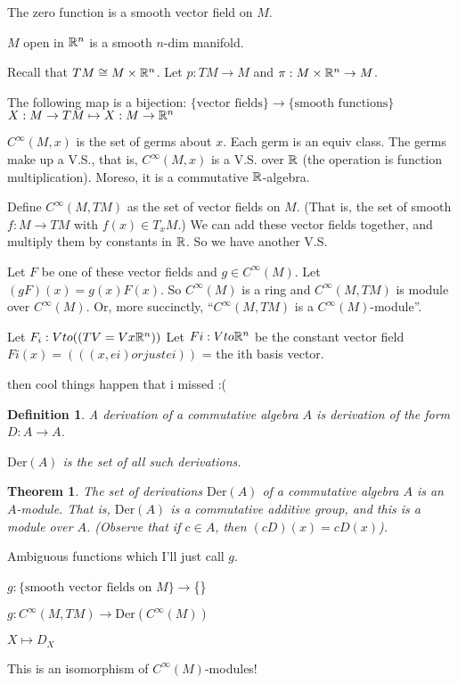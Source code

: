 \documentclass[11pt,leqno,oneside]{amsart}
\newcommand{\Der}{\text{Der}}
\theoremstyle{mystyle} \newtheorem{thrm}[thm]{Theorem}
\theoremstyle{mystyle} \newtheorem{defi}[thm]{Definition}
\begin{document}
\begin{example}
	The zero function is a smooth vector field on $M$.
\end{example}
\begin{example}
	$M$ open in ${\mathbb R}^n$ is a smooth $n$-dim manifold.

	Recall that $TM \mathrel{\cong}   M \times {\mathbb R}^n$.  Let $p:TM \to M$ and $\pi:M \times {\mathbb R}^n \to M$.

	The following map is a bijection:
	$\{\text{vector fields}\} \to \{\text{smooth functions}\}$
	$        X: M \to TM      \mapsto     X: M \to {\mathbb R}^n$
\end{example}
\begin{example}
	$C^\infty(M,x)$ is the set of germs about $x$.
	Each germ is an equiv class.
	The germs make up a V.S., that is, $C^\infty(M,x)$ is a V.S. over ${\mathbb R}$ (the operation is function multiplication).  Moreso, it is a commutative ${\mathbb R}$-algebra.

	Define $C^\infty(M, TM)$ as the set of vector fields on $M$.  (That is, the set of smooth $f: M \to TM$ with $f(x) \in T_xM$.)  We can add these vector fields together, and multiply them by constants in ${\mathbb R}$.  So we have another V.S.

	Let $F$ be one of these vector fields and $g \in C^\infty(M)$.
	Let $(gF)(x) = g(x)F(x)$.
	So $C^\infty(M)$ is a ring and $C^\infty(M, TM)$ is module over $C^\infty(M)$.  Or, more succinctly, ``$C^\infty(M, TM)$ is a $C^\infty(M)$-module''.

	Let $F_i : V to ((TV = Vx{\mathbb R}^n))$
	Let $Fi : V to {\mathbb R}^n$ be the constant vector field $Fi(x) = (((x,ei) or just ei))$ = the ith basis vector.

	then cool things happen that i missed :(
\end{example}
\begin{defi}
	A \emph{derivation} of a commutative algebra $A$ is derivation of the form $D: A \to A$.

	$\Der(A)$ is the set of all such derivations.
\end{defi}
\begin{thrm}
	The set of derivations $\Der(A)$ of a commutative algebra $A$ is an $A$-module.  That is, $\Der(A)$ is a commutative additive group, and this is a module over $A$.  (Observe that if $c \in A$, then $(cD)(x) = cD(x)$).
\end{thrm}

\begin{prop}
	Ambiguous functions which I'll just call $g$.

	$g : \{\text{smooth vector fields on $M$}\} \to $\{\}

	$g : C^\infty(M,TM) \to \Der(C^\infty(M))$

	$X \mapsto D_X$

	This is an isomorphism of $C^\infty(M)$-modules!
\end{prop}
\end{document}
